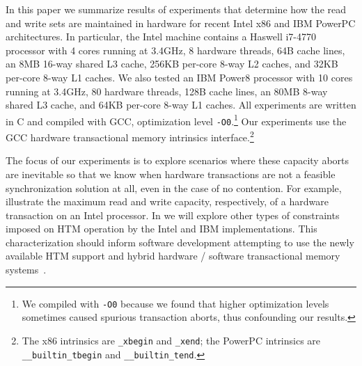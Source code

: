 
In this paper we summarize results of experiments 
that determine how the
read and write sets are maintained in hardware for recent 
Intel x86 and IBM PowerPC architectures. In particular,
the Intel machine contains a Haswell i7-4770 processor with 4
cores running at 3.4GHz, 8 hardware threads, 64B cache lines, an 8MB
16-way shared L3 cache, 256KB per-core 8-way L2 caches, 
and 32KB per-core 8-way L1 caches.
We also tested an IBM Power8 processor with 10 cores running at 3.4GHz,
80 hardware threads, 128B cache lines, an 80MB 8-way
shared L3 cache, and 64KB per-core 8-way L1 caches.
All experiments are written in C and compiled with GCC, 
optimization level
\texttt{-O0}.\footnote{We compiled with \texttt{-O0} because
we found that higher optimization levels sometimes caused spurious transaction
aborts, thus confounding our results.} Our experiments use the GCC
hardware transactional memory intrinsics interface.\footnote{The x86
intrinsics are \texttt{\_xbegin} and \texttt{\_xend}; the PowerPC intrinsics are
\texttt{\_\_builtin\_tbegin} and \texttt{\_\_builtin\_tend}.}

The focus of our experiments is to explore scenarios where these
capacity aborts are inevitable so that we know 
when hardware transactions are
not a feasible synchronization solution at all, 
even in the case of no contention. For example, 
illustrate the maximum read and write capacity, respectively,
of a hardware transaction on an Intel processor.  In 
we will explore other types of constraints imposed on
HTM operation by the Intel and IBM implementations.
This characterization should inform
software development attempting to use the newly available HTM support 
and hybrid hardware / software transactional memory
systems~\cite{DamronFeLe06,MatveevSh13}.
